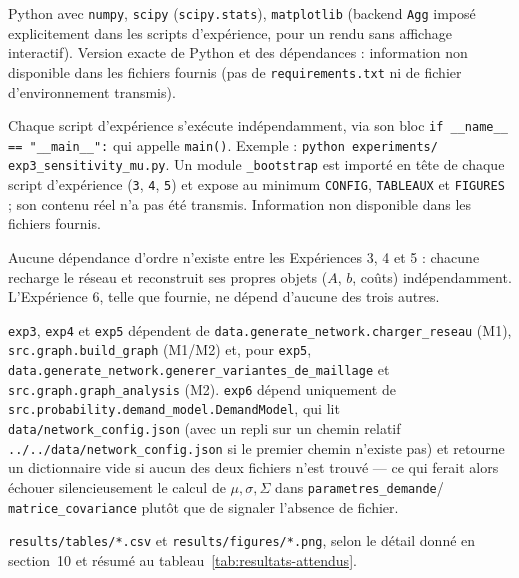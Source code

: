 \documentclass[11pt,a4paper]{article}
\begin{document}
\begin{description}[style=nextline]
  \item[Environnement] Python avec \texttt{numpy}, \texttt{scipy}
  (\texttt{scipy.stats}), \texttt{matplotlib} (backend \texttt{Agg} imposé
  explicitement dans les scripts d'expérience, pour un rendu sans affichage
  interactif). Version exacte de Python et des dépendances : information non
  disponible dans les fichiers fournis (pas de \texttt{requirements.txt} ni
  de fichier d'environnement transmis).
  \item[Commandes] Chaque script d'expérience s'exécute indépendamment,
  via son bloc \texttt{if \_\_name\_\_ == "\_\_main\_\_":} qui appelle
  \texttt{main()}. Exemple : \texttt{python experiments/
  exp3\_sensitivity\_mu.py}. Un module \texttt{\_bootstrap} est importé en
  tête de chaque script d'expérience (\texttt{3}, \texttt{4}, \texttt{5}) et
  expose au minimum \texttt{CONFIG}, \texttt{TABLEAUX} et \texttt{FIGURES} ;
  son contenu réel n'a pas été transmis. Information non disponible dans les
  fichiers fournis.
  \item[Ordre d'exécution] Aucune dépendance d'ordre n'existe entre les
  Expériences 3, 4 et 5 : chacune recharge le réseau et reconstruit ses
  propres objets ($A$, $b$, coûts) indépendamment. L'Expérience 6, telle que
  fournie, ne dépend d'aucune des trois autres.
  \item[Dépendances] \texttt{exp3}, \texttt{exp4} et \texttt{exp5} dépendent
  de \texttt{data.generate\_network.charger\_reseau} (M1),
  \texttt{src.graph.build\_graph} (M1/M2) et, pour \texttt{exp5},
  \texttt{data.generate\_network.generer\_variantes\_de\_maillage} et
  \texttt{src.graph.graph\_analysis} (M2). \texttt{exp6} dépend uniquement
  de \texttt{src.probability.demand\_model.DemandModel}, qui lit
  \texttt{data/network\_config.json} (avec un repli sur un chemin relatif
  \texttt{../../data/network\_config.json} si le premier chemin n'existe
  pas) et retourne un dictionnaire vide si aucun des deux fichiers n'est
  trouvé --- ce qui ferait alors échouer silencieusement le calcul de
  $\mu, \sigma, \Sigma$ dans \texttt{parametres\_demande}/
  \texttt{matrice\_covariance} plutôt que de signaler l'absence de fichier.
  \item[Fichiers générés] \texttt{results/tables/*.csv} et
  \texttt{results/figures/*.png}, selon le détail donné en section~10 et
  résumé au tableau~\ref{tab:resultats-attendus}.
\end{description}

\end{document}
